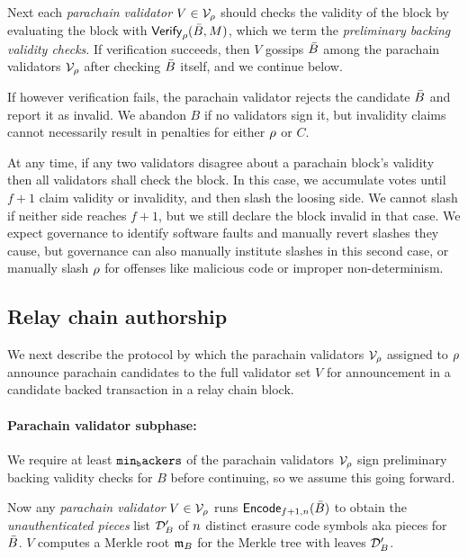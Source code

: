 Next each {\em parachain validator} $V \in \mathcal{V}_{\rho}$ should checks the validity of the block by evaluating the block with $\mathsf{Verify}_{\rho}(\bar{B},M)$, which we term the {\em preliminary backing validity checks}.  If verification succeeds, then $V$ gossips $\bar{B}$ among the parachain validators $\mathcal{V}_{\rho}$ after checking $\bar{B}$ itself, and we continue below.

If however verification fails, the parachain validator rejects the candidate $\bar{B}$ and report it as invalid.  We abandon $B$ if no validators sign it, but invalidity claims cannot necessarily result in penalties for either $\rho$ or $C$.  

At any time, if any two validators disagree about a parachain block's validity then all validators shall check the block.  In this case, we accumulate votes until $f+1$ claim validity or invalidity, and then slash the loosing side.  We cannot slash if neither side reaches $f+1$, but we still declare the block invalid in that case.  We expect governance to identify software faults and manually revert slashes they cause, but governance can also manually institute slashes in this second case, or manually slash $\rho$ for offenses like malicious code or improper non-determinism. 


\subsection{Relay chain authorship} %
\label{sec:backing}

We next describe the protocol by which the parachain validators $\mathcal{V}_{\rho}$ assigned to $\rho$ announce parachain candidates to the full validator set $V$ for announcement in a candidate backed transaction in a relay chain block.

\smallskip
\paragraph{Parachain validator subphase:}

We require at least $\mathtt{min_backers}$ of the parachain validators $\mathcal{V}_{\rho}$ sign preliminary backing validity checks for $B$ before continuing, so we assume this going forward.

Now any {\em parachain validator} $V \in \mathcal{V}_{\rho}$ runs $\mathsf{Encode}_{f+1,n}(\bar{B})$ to obtain the {\em unauthenticated pieces} list $\mathcal{D}'_B$ of $n$ distinct erasure code symbols aka pieces for $\bar{B}$.  $V$ computes a Merkle root $\mathfrak{m}_B$ for the Merkle tree with leaves $\mathcal{D}'_B$.  

